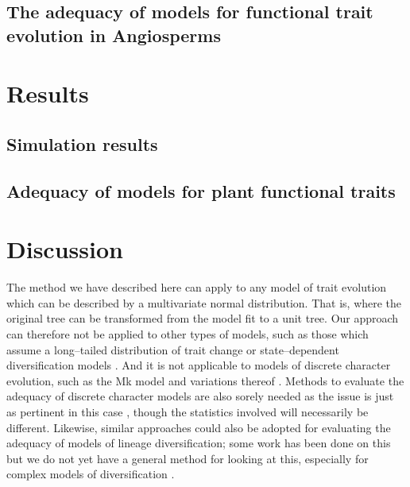 \documentclass[12pt]{article}
\begin{document}

\subsection*{The adequacy of models for functional trait evolution in Angiosperms}


\section*{Results}

\subsection*{Simulation results}

\subsection*{Adequacy of models for plant functional traits}

\section*{Discussion}

The method we have described here can apply to any model of trait evolution which can be described by a multivariate normal distribution. That is, where the original tree can be transformed from the model fit to a unit tree. Our approach can therefore not be applied to other types of models, such as those which assume a long--tailed distribution of trait change \citep[e.g.][]{Landis2012} or state--dependent diversification models \citep[e.g.][]{Bokma2008, Bokma2010, FitzJohn2010}. And it is not applicable to models of discrete character evolution, such as the Mk model \citep{Pagel1994, Lewis2001} and variations thereof \citep[e.g.][]{Maddison2007, WagnerMarcot2010, Mazeralli2012, Beaulieu2013} \citep[but see Felsenstein's threshold model;][]{Felsenstein2005, Felsenstein2012}. Methods to evaluate the adequacy of discrete character models are also sorely needed as the issue is just as pertinent in this case \citep{ReadNee1995, MaddisonFitzJohn}, though the statistics involved will necessarily be different. Likewise, similar approaches could also be adopted for evaluating the adequacy of models of lineage diversification; some work has been done on this \citep[e.g.][]{Rabosky2009AmNat, Rabosky2012, Hohna2013} but we do not yet have a general method for looking at this, especially for complex models of diversification \citep[e.g.][]{Stadler2011, Etienne2012}.
\end{document}
